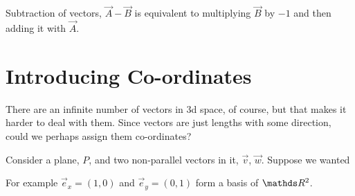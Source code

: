 Subtraction of vectors, \(\vec{A} - \vec{B}\) is equivalent to multiplying \(\vec{B}\) 
by \(-1\) and then adding it with \(\vec{A}\).

\section{Introducing Co-ordinates}

There are an infinite number of vectors in 3d space, of course,
but that makes it harder to deal with them. Since vectors 
are just lengths with some direction, could we perhaps assign them 
co-ordinates? 


Consider a plane, \(P\), and two non-parallel vectors in it,
\(\vec{v}\), \(\vec{w}\). Suppose we wanted 

\begin{example}
  For example \(\vec{e}_x = (1, 0)\) and \(\vec{e}_y = (0, 1)\) form a basis of \(\RR^2\).
\end{example}